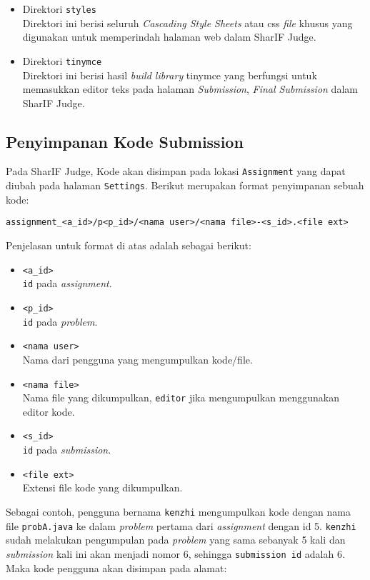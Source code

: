 \begin{itemize}
	\item Direktori \verb|styles| \\
	      Direktori ini berisi seluruh \textit{Cascading Style Sheets} atau css \textit{file} khusus yang digunakan untuk memperindah halaman web dalam SharIF Judge.
	\item Direktori \verb|tinymce| \\
	      Direktori ini berisi hasil \textit{build library} tinymce yang berfungsi  untuk memasukkan editor teks pada halaman \textit{Submission}, \textit{Final Submission} dalam SharIF Judge.
\end{itemize}

\subsection{Penyimpanan Kode Submission}
\label{sub:3:1:penyimpanankode}
Pada SharIF Judge, Kode akan disimpan pada lokasi \verb|Assignment| yang dapat diubah pada halaman \verb|Settings|. Berikut merupakan format penyimpanan sebuah kode:

\begin{center}
	\verb|assignment_<a_id>/p<p_id>/<nama user>/<nama file>-<s_id>.<file ext>|
\end{center}

Penjelasan untuk format di atas adalah sebagai berikut:

\begin{itemize}
	\item \verb|<a_id>| \\
	      \verb|id| pada \textit{assignment}.
	\item \verb|<p_id>| \\
	      \verb|id| pada \textit{problem}.
	\item \verb|<nama user>| \\
	      Nama dari pengguna yang mengumpulkan kode/file.
	\item \verb|<nama file>| \\
	      Nama file yang dikumpulkan, \verb|editor| jika mengumpulkan menggunakan editor kode.
	\item \verb|<s_id>| \\
	      \verb|id| pada \textit{submission}.
	\item \verb|<file ext>| \\
	      Extensi file kode yang dikumpulkan.
\end{itemize}

Sebagai contoh, pengguna bernama \verb|kenzhi| mengumpulkan kode dengan nama file \verb|probA.java| ke dalam \textit{problem} pertama dari \textit{assignment} dengan id 5. \verb|kenzhi| sudah melakukan pengumpulan pada \textit{problem} yang sama sebanyak 5 kali dan \textit{submission} kali ini akan menjadi nomor 6, sehingga \verb|submission id| adalah 6. Maka kode pengguna akan disimpan pada alamat:

